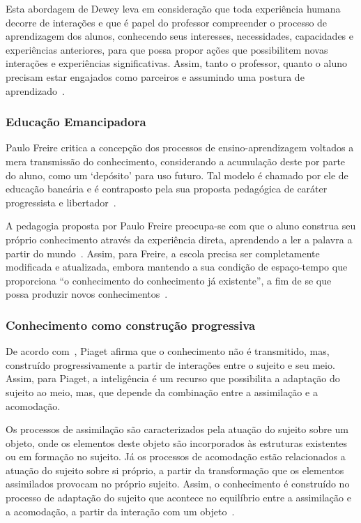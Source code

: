 Esta abordagem de Dewey leva em consideração que toda experiência humana decorre de interações e que é papel do professor compreender o processo de aprendizagem dos alunos, conhecendo seus interesses, necessidades, capacidades e experiências anteriores, para que possa propor ações que possibilitem novas interações e experiências significativas. Assim, tanto o professor, quanto o aluno precisam estar engajados como parceiros e assumindo uma postura de aprendizado~\citep{Almeida:2000}.

\subsubsection{Educação Emancipadora}

Paulo Freire critica a concepção dos processos de ensino-aprendizagem voltados a mera transmissão do conhecimento, considerando a acumulação deste por parte do aluno, como um `depósito' para uso futuro. Tal modelo é chamado por ele de educação bancária e é contraposto pela sua proposta pedagógica de caráter progressista e libertador~\citep{Freire:1987, Almeida:2000}.

A pedagogia proposta por Paulo Freire preocupa-se com que o aluno construa seu próprio conhecimento através da experiência direta, aprendendo a ler a palavra a partir do mundo~\citep{Almeida:2000}. Assim, para Freire, a escola precisa ser completamente modificada e atualizada, embora mantendo a sua condição de espaço-tempo que proporciona ``o conhecimento do conhecimento já existente'', a fim de se que possa produzir novos conhecimentos~\citep{Freire:1996}.

\subsubsection{Conhecimento como construção progressiva}\label{subsub:piaget}
De acordo com~\cite{Almeida:2000}, Piaget afirma que o conhecimento não é transmitido, mas, construído progressivamente a partir de interações entre o sujeito e seu meio. Assim, para Piaget, a inteligência é um recurso que possibilita a adaptação do sujeito ao meio, mas, que depende da combinação entre a assimilação e a acomodação.

Os processos de assimilação são caracterizados pela atuação do sujeito sobre um objeto, onde os elementos deste objeto são incorporados às estruturas existentes ou em formação no sujeito. Já os processos de acomodação estão relacionados a atuação do sujeito sobre si próprio, a partir da transformação que os elementos assimilados provocam no próprio sujeito. Assim, o conhecimento é construído no processo de adaptação do sujeito que acontece no equilíbrio entre a assimilação e a acomodação, a partir da interação com um objeto~\citep{Almeida:2000}.

